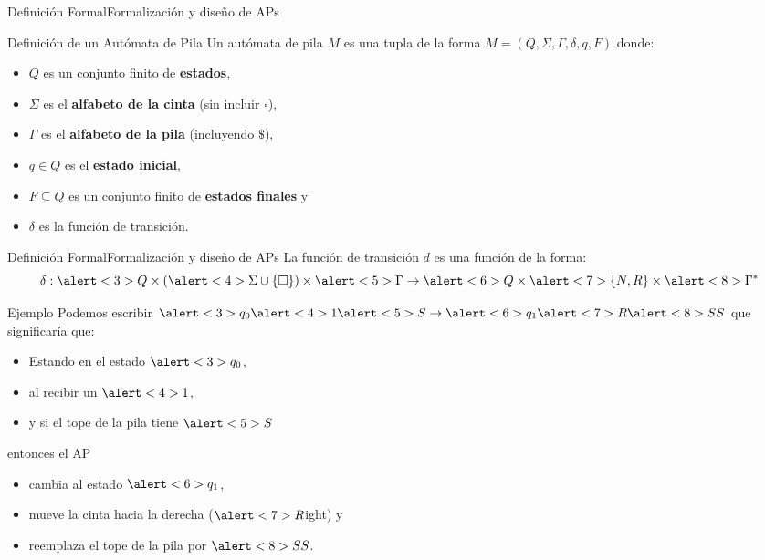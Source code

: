 \documentclass[spanish, handout]{beamer}
\begin{document}
\begin{frame}{Definición Formal}{Formalización y diseño de APs}
    \begin{block}{Definición de un Autómata de Pila}
        Un autómata de pila $M$ es una tupla de la forma $M = (Q, \Sigma, \Gamma, \delta, q, F)$ donde: \pause
        \begin{itemize}
            \item $Q$ es un conjunto finito de \textbf{estados}, \pause
            \item $\Sigma$ es el \textbf{alfabeto de la cinta} (sin incluir $\square$), \pause
            \item $\Gamma$ es el \textbf{alfabeto de la pila} (incluyendo $\$$), \pause
            \item $q \in Q$ es el \textbf{estado inicial}, \pause
            \item $F \subseteq Q$ es un conjunto finito de \textbf{estados finales} y \pause
            \item $\delta$ es la función de transición.
        \end{itemize}
    \end{block}
\end{frame}

\begin{frame}{Definición Formal}{Formalización y diseño de APs}
    La función de transición $d$ es una función de la forma:
        \[\delta : \alert<3>{Q} \times (\alert<4>{\Sigma \cup \{\square\}}) \times \alert<5>{\Gamma} \to \alert<6>{Q} \times \alert<7>{\{N,R\}} \times \alert<8>{\Gamma^*}\] \pause
        \vspace{-1.5ex}
    \begin{exampleblock}{Ejemplo}
        Podemos escribir $\alert<3>{q_0} \alert<4>{1} \alert<5>{S} \to \alert<6>{q_1} \alert<7>{R} \alert<8>{SS}$ que significaría que: \pause
        \begin{itemize}
            \item Estando en el estado $\alert<3>{q_0}$, \pause
            \item al recibir un $\alert<4>{1}$, \pause
            \item y si el tope de la pila tiene $\alert<5>{S}$ \pause
        \end{itemize}
        entonces el AP
        \begin{itemize}
            \item cambia al estado $\alert<6>{q_1}$, \pause
            \item mueve la cinta hacia la derecha ($\alert<7>{R}$ight) y \pause
            \item reemplaza el tope de la pila por $\alert<8>{SS}$.
        \end{itemize}
    \end{exampleblock}
\end{frame}
\end{document}
